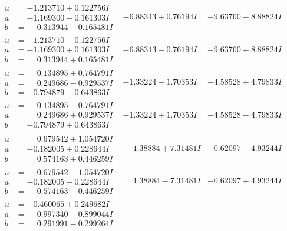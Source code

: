 \documentclass[1p]{elsarticle_modified}
\theoremstyle{definition}
\begin{document}
$$\begin{array}{c|c|c}
\begin{aligned}
u &= -1.213710 + 0.122756 I \\
a &= -1.169300 - 0.161303 I \\
b &= \phantom{-}0.313944 - 0.165481 I\end{aligned}
 & -6.88343 + 0.76194 I & -9.63760 - 8.88824 I \\ \hline\begin{aligned}
u &= -1.213710 - 0.122756 I \\
a &= -1.169300 + 0.161303 I \\
b &= \phantom{-}0.313944 + 0.165481 I\end{aligned}
 & -6.88343 - 0.76194 I & -9.63760 + 8.88824 I \\ \hline\begin{aligned}
u &= \phantom{-}0.134895 + 0.764791 I \\
a &= \phantom{-}0.249686 - 0.929537 I \\
b &= -0.794879 - 0.643863 I\end{aligned}
 & -1.33224 - 1.70353 I & -4.58528 + 4.79833 I \\ \hline\begin{aligned}
u &= \phantom{-}0.134895 - 0.764791 I \\
a &= \phantom{-}0.249686 + 0.929537 I \\
b &= -0.794879 + 0.643863 I\end{aligned}
 & -1.33224 + 1.70353 I & -4.58528 - 4.79833 I \\ \hline\begin{aligned}
u &= \phantom{-}0.679542 + 1.054720 I \\
a &= -0.182005 + 0.228644 I \\
b &= \phantom{-}0.574163 + 0.446259 I\end{aligned}
 & \phantom{-}1.38884 + 7.31481 I & -0.62097 - 4.93244 I \\ \hline\begin{aligned}
u &= \phantom{-}0.679542 - 1.054720 I \\
a &= -0.182005 - 0.228644 I \\
b &= \phantom{-}0.574163 - 0.446259 I\end{aligned}
 & \phantom{-}1.38884 - 7.31481 I & -0.62097 + 4.93244 I \\ \hline\begin{aligned}
u &= -0.460065 + 0.249682 I \\
a &= \phantom{-}0.997340 - 0.899044 I \\
b &= \phantom{-}0.291991 - 0.299264 I\end{aligned}

\end{array}$$
\end{document}
